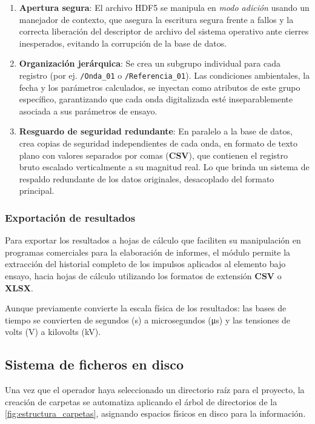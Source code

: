 \begin{enumerate}
    \item \textbf{Apertura segura}: El archivo HDF5 se manipula en \emph{modo adición} usando un manejador de contexto, que asegura la
    escritura segura frente a fallos y la correcta liberación del descriptor de archivo del sistema operativo ante cierres inesperados, evitando la corrupción de la base de datos.
    \item \textbf{Organización jerárquica}: Se crea un subgrupo individual para cada registro (por ej. \texttt{/Onda\_01} o \texttt{/Referencia\_01}). Las condiciones ambientales, la fecha y los parámetros calculados, se inyectan como atributos de este grupo específico, garantizando que cada onda digitalizada esté inseparablemente asociada a sus parámetros de ensayo.
    \item \textbf{Resguardo de seguridad redundante}: En paralelo a la base de datos, crea copias de seguridad independientes de cada onda, en formato de texto plano con valores separados por comas (\textbf{CSV}), que contienen el registro bruto escalado verticalmente a su magnitud real. Lo que brinda un sistema de respaldo redundante de los datos originales, desacoplado del formato principal.
\end{enumerate}

\subsubsection{Exportación de resultados}
\label{subsec:estructura_base_datos}

Para exportar los resultados a hojas de cálculo que faciliten su manipulación en programas comerciales para la elaboración de informes, el módulo permite la extracción del historial completo de los impulsos aplicados al elemento bajo ensayo, hacia hojas de cálculo utilizando los formatos de extensión \textbf{CSV} o \textbf{XLSX}.

Aunque previamente convierte la escala física de los resultados: las bases de tiempo se convierten de segundos (\unit{\second}) a microsegundos (\unit{\micro\second}) y las tensiones de volts (\unit{\volt}) a kilovolts (\unit{\kilo\volt}).


\subsection{Sistema de ficheros en disco}
\label{subsec:estructura_ficheros_disco}

Una vez que el operador haya seleccionado un directorio raíz para el proyecto, la creación de carpetas se automatiza aplicando el árbol de directorios de la \autoref{fig:estructura_carpetas}, asignando espacios físicos en disco para la información.

